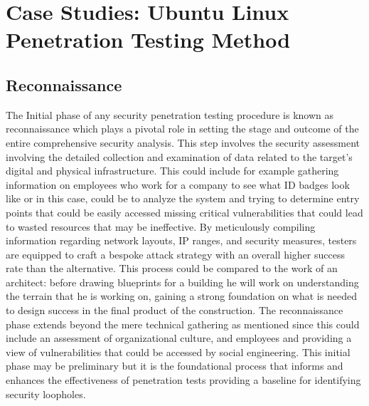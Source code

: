 \documentclass[manuscript,acmsmall,anonymous,review,screen,nonacm=true, authorversion=true]{acmart}
\begin{document}

\section{Case Studies:  Ubuntu Linux Penetration Testing Method}
\subsection{ Reconnaissance}
The Initial phase of any security penetration testing procedure is known as
reconnaissance which plays a pivotal role in setting the stage and outcome of the entire
comprehensive security analysis. This step involves the security assessment
involving the detailed collection and examination of data related to the target’s digital and
physical infrastructure. This could include for example gathering information on
employees who work for a company to see what ID badges look like or in this case, could be to
analyze the system and trying to determine entry points that could be easily accessed missing
critical vulnerabilities that could lead to wasted resources that may be ineffective.
By meticulously compiling information regarding network layouts, IP ranges, and security
measures, testers are equipped to craft a bespoke attack strategy with an overall higher success
rate than the alternative. This process could be compared to the work of an
architect: before drawing blueprints for a building he will work on understanding the terrain that
he is working on, gaining a strong foundation on what is needed to design success in the final
product of the construction. The reconnaissance phase extends beyond the mere
technical gathering as mentioned since this could include an assessment of organizational
culture, and employees and providing a view of vulnerabilities that could be accessed by social
engineering. This initial phase may be preliminary but it is the foundational
process that informs and enhances the effectiveness of penetration tests providing a baseline for
identifying security loopholes.
\end{document}
